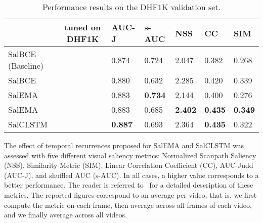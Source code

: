 \documentclass{bmvc2k}
\newcommand{\cmark}{\ding{51}}\newcommand{\xmark}{\ding{55}}
\begin{document}
\begin{table}[t]

\begin{center}
\begin{tabularx}{\textwidth}{Xclllll}
\toprule
 & tuned on DHF1K & AUC-J  &s-AUC & NSS 	&  CC  & SIM\\
\midrule
SalBCE (Baseline) &\xmark & 0.874 & 0.724 &	2.047 & 0.382 & 0.268 \\
SalBCE &\cmark & 0.880 & 0.632 &	2.285 & 0.420 & 0.339 \\
SalEMA  &\xmark & 0.883 & \textbf{0.734} & 2.144 & 0.400 & 0.276\\
SalEMA &\cmark & 0.883 & 0.685 & \textbf{2.402 }& \textbf{0.435 }& \textbf{0.349}\\
SalCLSTM &\cmark&\textbf{ 0.887} & 0.693 & 2.364 & \textbf{0.435 }& 0.322  \\

\bottomrule
\end{tabularx}
\end{center}

\caption{Performance results on the DHF1K validation set.}
\label{tab:SalEMAvsSalCLSTM}
\end{table}

The effect of temporal recurrences proposed for SalEMA and SalCLSTM was assessed with five different visual saliency metrics: Normalized Scanpath Saliency (NSS), Similarity Metric (SIM), Linear Correlation Coefficient (CC), AUC-Judd (AUC-J), and shuffled AUC (s-AUC). In all cases, a higher value corresponds to a better performance. The reader is referred to~\cite{bylinskii2019different} for a detailed description of these metrics. The reported figures correspond to an average per video, that is, we first compute the metric on each frame, then average across all frames of each video, and we finally average across all videos.
\end{document}
